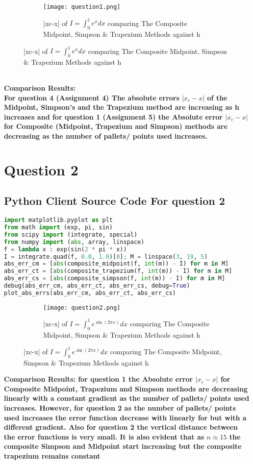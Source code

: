 \documentclass{article}
\begin{document}
\begin{figure}[h!]
  \centering
  \begin{subfigure}{\linewidth}
    \texttt{[image: question1.png]}
    \caption{|xc-x| of $ I = \int_{0}^{1} e^x dx $ comparing The Composite Midpoint, Simpson & Trapezium Methods against h}
  \end{subfigure}
\end{figure}
\textbf{\\Comparison Results:\\
For question 4 (Assignment 4) The absolute errors $| x_c - x|$ of the Midpoint, Simpson's and 
the Trapezium method are increasing as h increases and for question 1 (Assignment 5) the Absolute
error $| x_c - x|$ for Composite (Midpoint, Trapezium and Simpson) methods are decreasing as the number
of pallets/ points used increases.}
\pagebreak


\section*{Question 2}
\subsection*{Python Client Source Code For question 2}
\begin{lstlisting}[language=Python]
import matplotlib.pyplot as plt
from math import (exp, pi, sin)
from scipy import (integrate, special)
from numpy import (abs, array, linspace)
f = lambda x : exp(sin(2 * pi * x))
I = integrate.quad(f, 0.0, 1.0)[0]; M = linspace(3, 19, 5)
abs_err_cm = [abs(composite_midpoint(f, int(m)) - I) for m in M]
abs_err_ct = [abs(composite_trapezium(f, int(m)) - I) for m in M]
abs_err_cs = [abs(composite_simpson(f, int(m)) - I) for m in M]
debug(abs_err_cm, abs_err_ct, abs_err_cs, debug=True)
plot_abs_errs(abs_err_cm, abs_err_ct, abs_err_cs)
\end{lstlisting}
\begin{figure}[h!]
  \centering
  \begin{subfigure}{\linewidth}
    \texttt{[image: question2.png]}
    \caption{|xc-x| of $ I = \int_{0}^{1} e^{\sin(2 \pi x)} dx $ comparing The Composite Midpoint, Simpson & Trapezium Methods against h}
  \end{subfigure}
\end{figure}
\textbf{Comparison Results: for question 1 the Absolute
error $| x_c - x|$ for Composite Midpoint, Trapezium and Simpson methods are decreasing linearly with a constant gradient as the number of pallets/ points used increases. However, for question 2 as the number of pallets/ points used increases the error function decrease with linearly for but with a different gradient. Also for question 2 the vertical distance between the error functions is very small. It is also evident that as $n \approx 15 $ the composite Simpson and Midpoint start increasing but the composite trapezium remains constant}
\pagebreak
\end{document}
